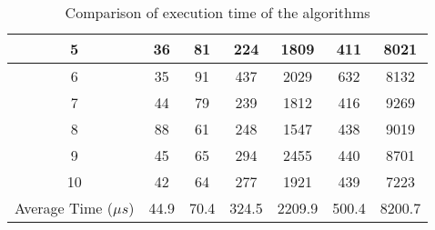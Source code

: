 \documentclass[final,3p]{CSP}
\begin{document}
\begin{table}
\begin{tabular}{|c|c|c|c|c|c|c|}
            5                                           & 36                                        & 81                                          & 224                                                  & 1809                                                  & 411                                              & 8021                                              \\ \hline
            6                                           & 35                                        & 91                                          & 437                                                  & 2029                                                  & 632                                              & 8132                                              \\ \hline
            7                                           & 44                                        & 79                                          & 239                                                  & 1812                                                  & 416                                              & 9269                                              \\ \hline
            8                                           & 88                                        & 61                                          & 248                                                  & 1547                                                  & 438                                              & 9019                                              \\ \hline
            9                                           & 45                                        & 65                                          & 294                                                  & 2455                                                  & 440                                              & 8701                                              \\ \hline
            10                                          & 42                                        & 64                                          & 277                                                  & 1921                                                  & 439                                              & 7223                                              \\ \hline
            Average Time ($\mu s$)                               & 44.9                                      & 70.4                                        & 324.5                                                & 2209.9                                                & 500.4                                            & 8200.7                                            \\ \hline
        \end{tabular}
        \caption {Comparison of execution time of the algorithms}
        \label{table:runtime-comparisons}
    \end{table}
\end{document}
